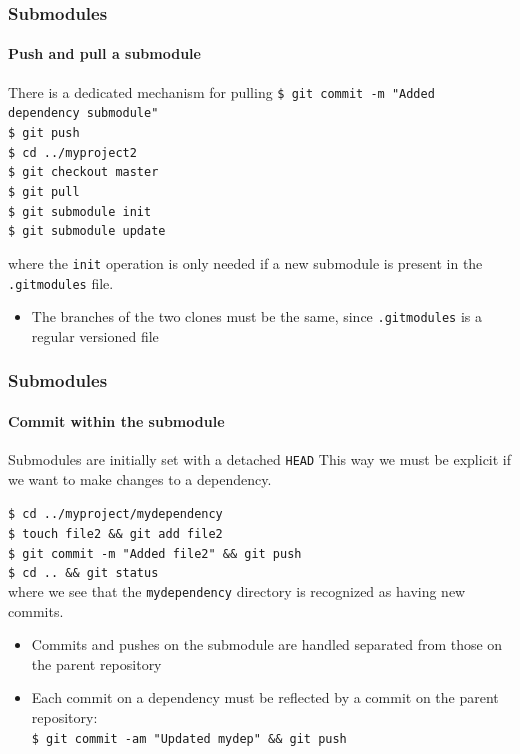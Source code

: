 \begin{frame}
\frametitle{Submodules}
\framesubtitle{Push and pull a submodule}

\begin{block}{There is a dedicated mechanism for pulling}
\texttt{\$ git commit -m "Added dependency submodule"} \\
\texttt{\$ git push} \\
\texttt{\$ cd ../myproject2} \\
\texttt{\$ git checkout master} \\
\texttt{\$ git pull} \\
\texttt{\$ git submodule init} \\
\texttt{\$ git submodule update}

\medskip
where the \texttt{init} operation is only needed if a new submodule is present in the \texttt{.gitmodules} file.
\begin{itemize}
\item The branches of the two clones must be the same, since \texttt{.gitmodules} is a regular versioned file
\end{itemize}
\end{block}
\end{frame}

\begin{frame}
\frametitle{Submodules}
\framesubtitle{Commit within the submodule}

\begin{block}{Submodules are initially set with a detached \texttt{HEAD}}
This way we must be explicit if we want to make changes to a dependency.

\medskip
\texttt{\$ cd ../myproject/mydependency} \\
\texttt{\$ touch file2 \&\& git add file2} \\
\texttt{\$ git commit -m "Added file2" \&\& git push} \\
\texttt{\$ cd .. \&\& git status} \\

\medskip
where we see that the \texttt{mydependency} directory is recognized as having new commits.
\begin{itemize}
\item Commits and pushes on the submodule are handled separated from those on the parent repository
\item Each commit on a dependency must be reflected by a commit on the parent repository: \\
\texttt{\$ git commit -am "Updated mydep" \&\& git push} \\
\end{itemize}
\end{block}

\end{frame}


